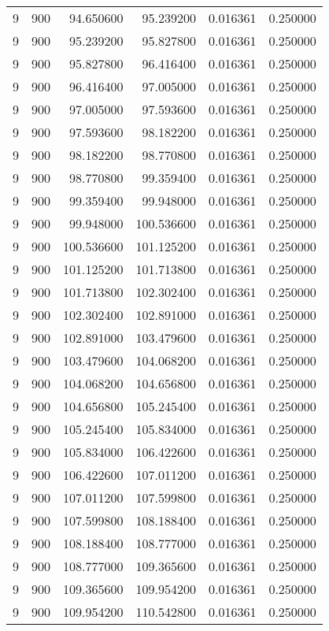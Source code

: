 \begin{longtable}{rrrrrr}
9 & 900 & 94.650600 & 95.239200 & 0.016361 & 0.250000 \\
9 & 900 & 95.239200 & 95.827800 & 0.016361 & 0.250000 \\
9 & 900 & 95.827800 & 96.416400 & 0.016361 & 0.250000 \\
9 & 900 & 96.416400 & 97.005000 & 0.016361 & 0.250000 \\
9 & 900 & 97.005000 & 97.593600 & 0.016361 & 0.250000 \\
9 & 900 & 97.593600 & 98.182200 & 0.016361 & 0.250000 \\
9 & 900 & 98.182200 & 98.770800 & 0.016361 & 0.250000 \\
9 & 900 & 98.770800 & 99.359400 & 0.016361 & 0.250000 \\
9 & 900 & 99.359400 & 99.948000 & 0.016361 & 0.250000 \\
9 & 900 & 99.948000 & 100.536600 & 0.016361 & 0.250000 \\
9 & 900 & 100.536600 & 101.125200 & 0.016361 & 0.250000 \\
9 & 900 & 101.125200 & 101.713800 & 0.016361 & 0.250000 \\
9 & 900 & 101.713800 & 102.302400 & 0.016361 & 0.250000 \\
9 & 900 & 102.302400 & 102.891000 & 0.016361 & 0.250000 \\
9 & 900 & 102.891000 & 103.479600 & 0.016361 & 0.250000 \\
9 & 900 & 103.479600 & 104.068200 & 0.016361 & 0.250000 \\
9 & 900 & 104.068200 & 104.656800 & 0.016361 & 0.250000 \\
9 & 900 & 104.656800 & 105.245400 & 0.016361 & 0.250000 \\
9 & 900 & 105.245400 & 105.834000 & 0.016361 & 0.250000 \\
9 & 900 & 105.834000 & 106.422600 & 0.016361 & 0.250000 \\
9 & 900 & 106.422600 & 107.011200 & 0.016361 & 0.250000 \\
9 & 900 & 107.011200 & 107.599800 & 0.016361 & 0.250000 \\
9 & 900 & 107.599800 & 108.188400 & 0.016361 & 0.250000 \\
9 & 900 & 108.188400 & 108.777000 & 0.016361 & 0.250000 \\
9 & 900 & 108.777000 & 109.365600 & 0.016361 & 0.250000 \\
9 & 900 & 109.365600 & 109.954200 & 0.016361 & 0.250000 \\
9 & 900 & 109.954200 & 110.542800 & 0.016361 & 0.250000 \\

\end{longtable}
